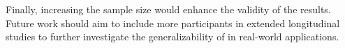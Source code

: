 Finally, increasing the sample size would enhance the validity of the results. Future work should aim to include more participants in extended longitudinal studies to further investigate the generalizability of \name{} in real-world applications.



